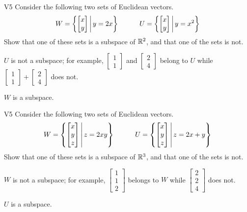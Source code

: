 \begin{problem}{V5}
Consider the following two sets of Euclidean vectors.
\[
  W = \left\{\begin{bmatrix} x \\ y \end{bmatrix}\,\middle|\,y=2x\right\}
\hspace{3em}
  U = \left\{\begin{bmatrix} x \\ y \end{bmatrix}\,\middle|\,y=x^2\right\}
\]
Show that one of these sets is a subspace of \(\mathbb{R}^2\), and
that one of the sets is not.
\end{problem}
\begin{solution}
\(U\) is not a subspace; for example, \(\begin{bmatrix} 1 \\ 1 \end{bmatrix}\)
and \(\begin{bmatrix} 2 \\ 4 \end{bmatrix}\) belong to \(U\) while
\(\begin{bmatrix} 1 \\ 1 \end{bmatrix}+\begin{bmatrix} 2 \\ 4 \end{bmatrix}\)
does not.

\(W\) is a subspace.
\end{solution}


\begin{problem}{V5}
Consider the following two sets of Euclidean vectors.
\[
  W = \left\{\begin{bmatrix} x \\ y \\ z \end{bmatrix}\,\middle|\,z=2xy\right\}
\hspace{3em}
  U = \left\{\begin{bmatrix} x \\ y \\ z \end{bmatrix}\,\middle|\,z=2x+y\right\}
\]
Show that one of these sets is a subspace of \(\mathbb{R}^3\), and
that one of the sets is not.
\end{problem}
\begin{solution}
\(W\) is not a subspace; for example,
\(\begin{bmatrix} 1 \\ 1 \\ 2 \end{bmatrix}\) belongs to \(W\) while
\(\begin{bmatrix} 2 \\ 2 \\ 4 \end{bmatrix}\)
does not.

\(U\) is a subspace.
\end{solution}
